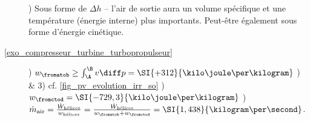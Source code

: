\begin{description}
					) Sous forme de $\Delta h$ -- l’air de sortie aura un volume spécifique et une température (énergie interne) plus importants. Peut-être également sous forme d’énergie cinétique.
	\item [\ref{exo_compresseur_turbine_turbopropulseur}]
					) $w_\fromatob \geq \int_\A^\B v \diff p = \SI{+312}{\kilo\joule\per\kilogram}$
					) \& 3) cf. \cref{fig_pv_evolution_irr_so}
					) $w_\fromctod = \SI{-729,3}{\kilo\joule\per\kilogram}$
					) $\dot{m}_\text{air} = \frac{\dot{W}_\text{hélices}}{w_\text{hélices}} = \frac{\dot{W}_\text{hélices}}{w_\fromatob + w_\fromctod} = \SI{1,438}{\kilogram\per\second}$.
\end{description}
